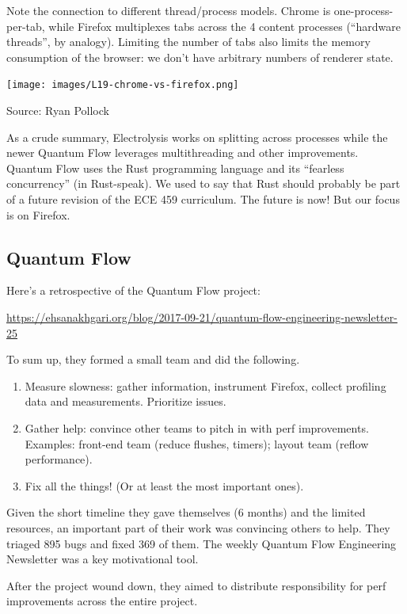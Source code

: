 \documentclass[a4paper]{report}
\begin{document}
Note the connection to different thread/process models.
Chrome is one-process-per-tab, while Firefox multiplexes tabs across
the 4 content processes (``hardware threads'', by analogy). Limiting
the number of tabs also limits the memory consumption of the browser:
we don't have arbitrary numbers of renderer state.

\begin{center}
\texttt{[image: images/L19-chrome-vs-firefox.png]}
\end{center}
Source: Ryan Pollock~\cite{goldilocks}

As a crude summary, Electrolysis works on splitting across processes
while the newer Quantum Flow leverages multithreading and other
improvements.  Quantum Flow uses the Rust programming language and its
``fearless concurrency'' (in Rust-speak). We used to say that Rust should probably be part of a future revision of the ECE 459 curriculum. The future is now! But our focus is on Firefox.

\subsection*{Quantum Flow}
Here's a retrospective of the Quantum Flow project:
\begin{center}
\url{https://ehsanakhgari.org/blog/2017-09-21/quantum-flow-engineering-newsletter-25}
\end{center}

To sum up, they formed a small team and did the following.
\begin{enumerate}[noitemsep]
\item Measure slowness: gather information, instrument Firefox, collect profiling data and measurements. Prioritize issues.
\item Gather help: convince other teams to pitch in with perf improvements. Examples: front-end team (reduce flushes, timers); layout team (reflow performance).
\item Fix all the things! (Or at least the most important ones).
\end{enumerate}
Given the short timeline they gave themselves (6 months) and the limited resources, an important part of their work was convincing others to help.
They triaged 895 bugs and fixed 369 of them. The weekly Quantum Flow Engineering Newsletter was a key motivational tool.

After the project wound down, they aimed to distribute responsibility for perf improvements across the entire project.
\end{document}
